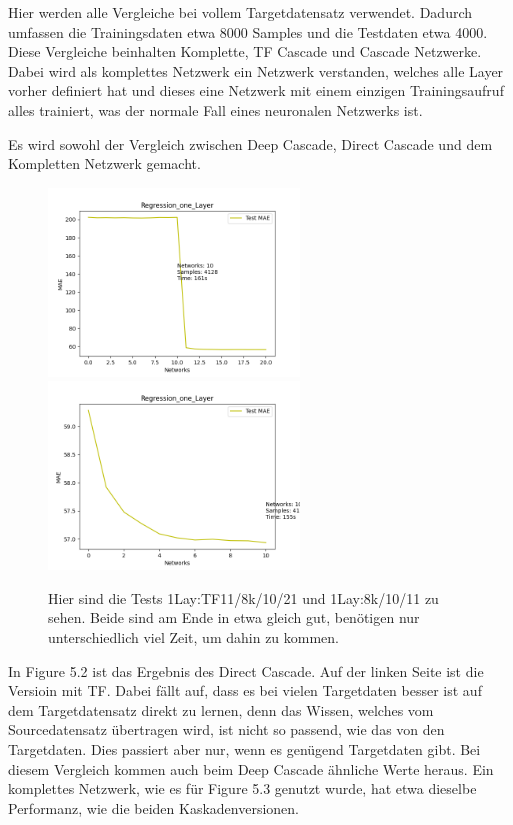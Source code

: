 Hier werden alle Vergleiche bei vollem Targetdatensatz verwendet. 
Dadurch umfassen die Trainingsdaten etwa 8000 Samples und die Testdaten etwa 4000. 
Diese Vergleiche beinhalten Komplette, TF Cascade und Cascade Netzwerke. Dabei wird als komplettes Netzwerk ein Netzwerk verstanden, welches alle 
Layer vorher definiert hat und dieses eine Netzwerk mit einem einzigen Trainingsaufruf alles trainiert, was der normale Fall eines 
neuronalen Netzwerks ist. 

Es wird sowohl der Vergleich zwischen Deep Cascade, Direct Cascade und dem Kompletten Netzwerk gemacht.  

\begin{figure}[htpb]
    \includegraphics[height=5cm]{../../Plots/ba_plots/regression_large/onelayer_ts.png}
    \includegraphics[height=5cm]{../../Plots/ba_plots/regression_large/woonelayer_ts.png}
    \caption{\label{fig:largeregr2} 
    \small{Hier sind die Tests 1Lay:TF11/8k/10/21 und 1Lay:8k/10/11 zu sehen. Beide sind am Ende in etwa gleich gut, benötigen nur unterschiedlich 
    viel Zeit, um dahin zu kommen.}}
\end{figure}

In Figure 5.2 ist das Ergebnis des Direct Cascade. Auf der linken Seite ist die Versioin mit TF. Dabei fällt auf, dass es bei vielen 
Targetdaten besser ist auf dem Targetdatensatz direkt zu lernen, denn 
das Wissen, welches vom Sourcedatensatz übertragen wird, ist nicht so passend, wie das von den Targetdaten. Dies passiert aber nur, wenn es 
genügend Targetdaten gibt. Bei diesem Vergleich kommen auch beim Deep Cascade ähnliche Werte heraus. 
Ein komplettes Netzwerk, wie es für Figure 5.3 genutzt wurde, hat etwa dieselbe Performanz, wie die beiden Kaskadenversionen. 

